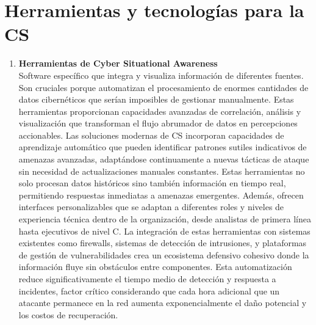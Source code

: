 \section{Herramientas y tecnologías para la CS}
\begin{enumerate}
\item \textbf{Herramientas de Cyber Situational Awareness} \\
Software específico que integra y visualiza información de diferentes fuentes. Son cruciales porque automatizan el procesamiento de enormes cantidades de datos cibernéticos que serían imposibles de gestionar manualmente. Estas herramientas proporcionan capacidades avanzadas de correlación, análisis y visualización que transforman el flujo abrumador de datos en percepciones accionables. Las soluciones modernas de CS incorporan capacidades de aprendizaje automático que pueden identificar patrones sutiles indicativos de amenazas avanzadas, adaptándose continuamente a nuevas tácticas de ataque sin necesidad de actualizaciones manuales constantes. Estas herramientas no solo procesan datos históricos sino también información en tiempo real, permitiendo respuestas inmediatas a amenazas emergentes. Además, ofrecen interfaces personalizables que se adaptan a diferentes roles y niveles de experiencia técnica dentro de la organización, desde analistas de primera línea hasta ejecutivos de nivel C. La integración de estas herramientas con sistemas existentes como firewalls, sistemas de detección de intrusiones, y plataformas de gestión de vulnerabilidades crea un ecosistema defensivo cohesivo donde la información fluye sin obstáculos entre componentes. Esta automatización reduce significativamente el tiempo medio de detección y respuesta a incidentes, factor crítico considerando que cada hora adicional que un atacante permanece en la red aumenta exponencialmente el daño potencial y los costos de recuperación.


\end{enumerate}
